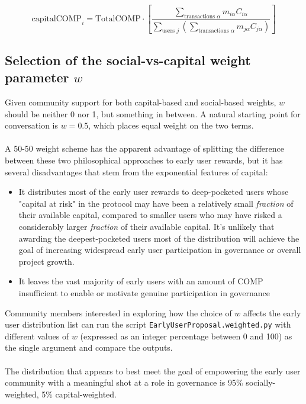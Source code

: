 \documentclass[12pt]{article}
\begin{document}
\begin{equation*}
  \mathrm{capitalCOMP}_i = \textrm{TotalCOMP}\cdot\left[\frac{\sum\limits_{\textrm{transactions }\alpha}{m_{i\alpha}C_{i\alpha}}}{\sum\limits_{\textrm{users }j}\left({\sum\limits_{\textrm{transactions }\alpha}{m_{j\alpha}C_{j\alpha}}}\right)}\right]
\end{equation*}

\subsection{Selection of the social-vs-capital weight parameter $w$}

Given community support for both capital-based and social-based weights,
$w$ should be neither 0 nor 1, but something in between. A natural starting
point for conversation is $w = 0.5$, which places equal weight on the two terms.
\\\\
A 50-50 weight scheme has the apparent advantage of splitting the difference
between these two philosophical approaches to early user rewards, but it has
several disadvantages that stem from the exponential features of capital:
\begin{itemize}
  \item{It distributes most of the early user rewards to deep-pocketed
        users whose "capital at risk" in the protocol may have been a
        relatively small {\em fraction} of their available capital,
        compared to smaller users who may have risked a considerably larger
        {\em fraction} of their available capital. It's unlikely that
        awarding the deepest-pocketed users most of the distribution will
        achieve the goal of increasing widespread early user participation
        in governance or overall project growth.}
  \item{It leaves the vast majority of early users with an amount of COMP
        insufficient to enable or motivate genuine participation in governance}
\end{itemize}

Community members interested in exploring how the choice of $w$ affects the
early user distribution list can run the script \texttt{EarlyUserProposal.weighted.py}
with different values of $w$ (expressed as an integer percentage between 0 and 100)
as the single argument and compare the outputs.
\\\\
The distribution that appears to best meet the goal of empowering the
early user community with a meaningful shot at a role in governance is
95\% socially-weighted, 5\% capital-weighted. 
\end{document}

